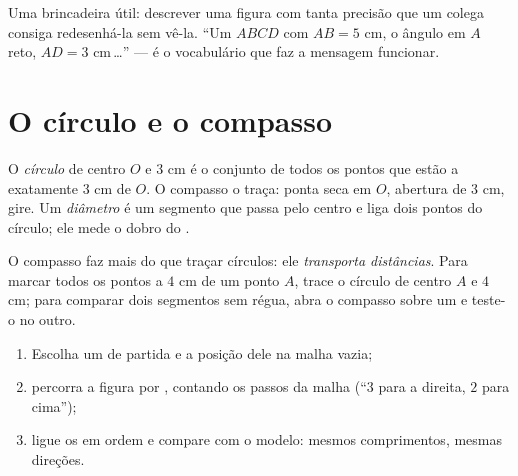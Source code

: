 \begin{example}\label{ex:g4:geometry:describe}
Uma brincadeira útil: descrever uma figura com tanta precisão que um
colega consiga redesenhá-la sem vê-la. ``Um  $ABCD$ com
$AB = 5$ cm, o ângulo em $A$ reto, $AD = 3$ cm\,\dots'' --- é o
vocabulário que faz a mensagem funcionar.
\end{example}

\section{O círculo e o compasso}

\begin{definition}[Círculo]\label{def:g4:geometry:circle}
O \emph{círculo} de centro $O$ e  $3$ cm é o conjunto de todos os
pontos que estão a exatamente $3$ cm de $O$. O compasso o traça:
ponta seca em $O$, abertura de $3$ cm, gire. Um
\emph{diâmetro} é um segmento que passa pelo centro e
liga dois pontos do círculo; ele mede o dobro do .
\end{definition}

\begin{example}\label{ex:g4:geometry:compass}
O compasso faz mais do que traçar círculos: ele \emph{transporta
distâncias}. Para marcar todos os pontos a $4$ cm de um ponto $A$,
trace o círculo de centro $A$ e  $4$ cm; para comparar dois
segmentos sem régua, abra o compasso sobre um e teste-o no outro.
\end{example}

\begin{method}\label{met:g4:geometry:reproduce}
\begin{enumerate}
  \item Escolha um  de partida e a posição dele na malha
        vazia;
  \item percorra a figura  por , contando os passos da
        malha (``$3$ para a direita, $2$ para cima'');
  \item ligue os  em ordem e compare com o modelo: mesmos
        comprimentos, mesmas direções.
\end{enumerate}
\end{method}

